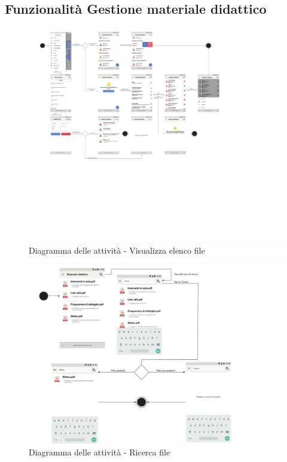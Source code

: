 \subsection{Funzionalità Gestione materiale didattico}
\begin{figure} [h]
	\centering
	\includegraphics[width=6in]{imgs/gruppo1/activity_diagrams/AD13_visualizza_elenco_file.pdf}
	\caption{Diagramma delle attività - Visualizza elenco file}
	\label{diag:visualizzaElencoFileAD}
\end{figure}
\newpage

\begin{figure}
	\centering
	\includegraphics[width=6in]{imgs/gruppo1/activity_diagrams/AD14_ricerca_file.pdf}
	\caption{Diagramma delle attività - Ricerca file}
	\label{diag:ricercaFileAD}
\end{figure}
\newpage

